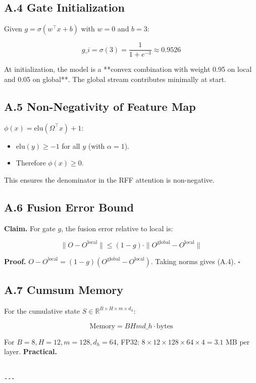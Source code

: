 \subsection{A.4 Gate Initialization}

Given $g = \sigma(w^\top x + b)$ with $w = 0$ and $b = 3$:

\[
g\_i = \sigma(3) = \frac{1}{1 + e^{-3}} \approx 0.9526
\tag{A.3}
\]

At initialization, the model is a **convex combination with weight 0.95 on 
local and 0.05 on global**. The global stream contributes minimally at start.

\subsection{A.5 Non-Negativity of Feature Map}

$\phi(x) = \mathrm{elu}(\Omega^\top x) + 1$:

\begin{itemize}
\item $\mathrm{elu}(y) \geq -1$ for all $y$ (with $\alpha = 1$).
\item Therefore $\phi(x) \geq 0$.

\end{itemize}
This ensures the denominator in the RFF attention is non-negative.

\subsection{A.6 Fusion Error Bound}

\textbf{Claim.} For gate $g$, the fusion error relative to local is:

\[
\|O - O^\text{local}\| \leq (1 - g) \cdot \|O^\text{global} - O^\text{local}\|
\tag{A.4}
\]

\textbf{Proof.} $O - O^\text{local} = (1 - g)(O^\text{global} - O^\text{local})$. 
Taking norms gives (A.4). $\square$

\subsection{A.7 Cumsum Memory}

For the cumulative state $S \in \mathbb{R}^{B \times H \times m \times d_h}$:

\[
\text{Memory} = B H m d\_h \cdot \text{bytes}
\tag{A.5}
\]

For $B=8, H=12, m=128, d_h=64$, FP32: $8 \times 12 \times 128 \times 64 \times 4 = 3.1$ MB per layer. \textbf{Practical.}
\begin{lstlisting}

---
\end{lstlisting}